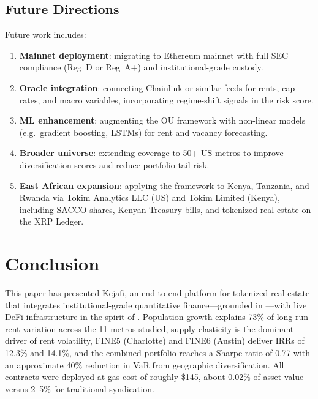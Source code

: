 \documentclass[11pt,letterpaper]{article}
\begin{document}
\subsection{Future Directions}

Future work includes:

\begin{enumerate}[leftmargin=2em]
  \item \textbf{Mainnet deployment}: migrating to Ethereum mainnet with full SEC
  compliance (Reg~D or Reg~A+) and institutional-grade custody.
  \item \textbf{Oracle integration}: connecting Chainlink or similar feeds for rents,
  cap rates, and macro variables, incorporating regime-shift signals in the risk score.
  \item \textbf{ML enhancement}: augmenting the OU framework with non-linear models
  (e.g.\ gradient boosting, LSTMs) for rent and vacancy forecasting.
  \item \textbf{Broader universe}: extending coverage to 50+ US metros to improve
  diversification scores and reduce portfolio tail risk.
  \item \textbf{East African expansion}: applying the framework to Kenya, Tanzania, and
  Rwanda via Tokim Analytics LLC (US) and Tokim Limited (Kenya), including SACCO shares,
  Kenyan Treasury bills, and tokenized real estate on the XRP Ledger.
\end{enumerate}

\section{Conclusion}
\label{sec:conclusion}

This paper has presented Kejafi, an end-to-end platform for tokenized real estate that
integrates institutional-grade quantitative finance---grounded in
\citet{vasicek1977,merton1976,case1989,saiz2010,glaeser2018,gyourko2015,guttal2016,angeris2020}---with
live DeFi infrastructure in the spirit of \citet{schar2021}. Population growth explains
73\% of long-run rent variation across the 11 metros studied, supply elasticity is the
dominant driver of rent volatility, FINE5 (Charlotte) and FINE6 (Austin) deliver IRRs of
12.3\% and 14.1\%, and the combined portfolio reaches a Sharpe ratio of 0.77 with an
approximate 40\% reduction in VaR from geographic diversification. All contracts were
deployed at gas cost of roughly \$145, about 0.02\% of asset value versus 2--5\% for
traditional syndication.
\end{document}
